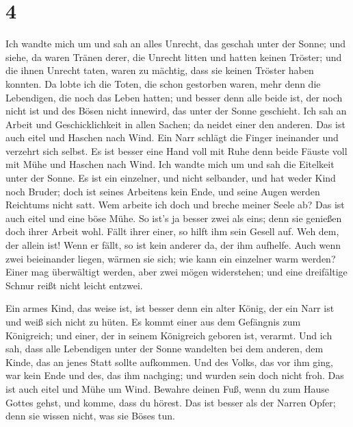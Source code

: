 \hypertarget{section-3}{%
\section{4}\label{section-3}}

 Ich wandte mich um und sah an alles Unrecht, das geschah
unter der Sonne; und siehe, da waren Tränen derer, die Unrecht litten
und hatten keinen Tröster; und die ihnen Unrecht taten, waren zu
mächtig, dass sie keinen Tröster haben konnten.  Da lobte
ich die Toten, die schon gestorben waren, mehr denn die Lebendigen, die
noch das Leben hatten;  und besser denn alle beide ist,
der noch nicht ist und des Bösen nicht innewird, das unter der Sonne
geschieht.  Ich sah an Arbeit und Geschicklichkeit in
allen Sachen; da neidet einer den anderen. Das ist auch eitel und
Haschen nach Wind.  Ein Narr schlägt die Finger ineinander
und verzehrt sich selbst.  Es ist besser eine Hand voll
mit Ruhe denn beide Fäuste voll mit Mühe und Haschen nach Wind.
 Ich wandte mich um und sah die Eitelkeit unter der Sonne.
 Es ist ein einzelner, und nicht selbander, und hat weder
Kind noch Bruder; doch ist seines Arbeitens kein Ende, und seine Augen
werden Reichtums nicht satt. Wem arbeite ich doch und breche meiner
Seele ab? Das ist auch eitel und eine böse Mühe.  So ist's
ja besser zwei als eins; denn sie genießen doch ihrer Arbeit wohl.
 Fällt ihrer einer, so hilft ihm sein Gesell auf. Weh
dem, der allein ist! Wenn er fällt, so ist kein anderer da, der ihm
aufhelfe.  Auch wenn zwei beieinander liegen, wärmen sie
sich; wie kann ein einzelner warm werden?  Einer mag
überwältigt werden, aber zwei mögen widerstehen; und eine dreifältige
Schnur reißt nicht leicht entzwei.

 Ein armes Kind, das weise ist, ist besser denn ein alter
König, der ein Narr ist und weiß sich nicht zu hüten.  Es
kommt einer aus dem Gefängnis zum Königreich; und einer, der in seinem
Königreich geboren ist, verarmt.  Und ich sah, dass alle
Lebendigen unter der Sonne wandelten bei dem anderen, dem Kinde, das an
jenes Statt sollte aufkommen.  Und des Volks, das vor ihm
ging, war kein Ende und des, das ihm nachging; und wurden sein doch
nicht froh. Das ist auch eitel und Mühe um Wind.  Bewahre
deinen Fuß, wenn du zum Hause Gottes gehst, und komme, dass du hörest.
Das ist besser als der Narren Opfer; denn sie wissen nicht, was sie
Böses tun.

